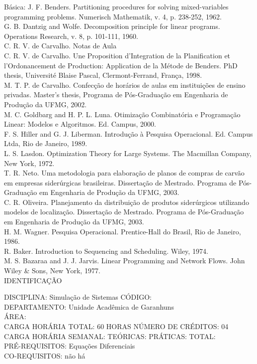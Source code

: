 \documentclass[
	12pt,				%
	openright,			%
  oneside,     %
	a4paper,			%
	english,			%
	french,				%
	spanish,			%
	brazil				%
	]{abntex2}
\begin{document}
\begin{apendicesenv}
Básica:
J. F. Benders. Partitioning procedures for solving mixed-variables
programming problems. Numerisch Mathematik, v. 4, p. 238-252, 1962. \\
G. B. Dantzig and Wolfe. Decomposition principle for linear programs.
Operations Research, v. 8, p. 101-111, 1960. \\
C. R. V. de Carvalho. Notas de Aula\\
C. R. V. de Carvalho. Une Proposition d'Integration de
la Planification et l'Ordonancement de Production:
Application de la Métode de Benders. PhD thesis, Université Blaise
Pascal, Clermont-Ferrand, França, 1998. \\
M. T. P. de Carvalho. Confecção de horários de aulas em instituições de
ensino privadas. Master's thesis, Programa de
Pós-Graduação em Engenharia de Produção da UFMG, 2002. \\
M. C. Goldbarg and H. P. L. Luna. Otimização Combinatória e Programação
Linear: Modelos e Algoritmos. Ed. Campus, 2000. \\
F. S. Hiller and G. J. Liberman. Introdução à Pesquisa Operacional. Ed.
Campus Ltda, Rio de Janeiro, 1989. \\
L. S. Lasdon. Optimization Theory for Large Systems. The Macmillan
Company, New York, 1972. \\
T. R. Neto. Uma metodologia para elaboração de planos de compras de
carvão em empresas siderúrgicas brasileiras. Dissertação de Mestrado.
Programa de Pós-Graduação em Engenharia de Produção da UFMG, 2003. \\
C. R. Oliveira. Planejamento da distribuição de produtos siderúrgicos
utilizando modelos de localização. Dissertação de Mestrado. Programa de
Pós-Graduação em Engenharia de Produção da UFMG, 2003. \\
H. M. Wagner. Pesquisa Operacional. Prentice-Hall do Brasil, Rio de
Janeiro, 1986.\\
R. Baker. Introduction to Sequencing and Scheduling. Wiley, 1974.\\
M. S. Bazaraa and J. J. Jarvis. Linear Programming and Network Flows.
John Wiley \& Sons, New York, 1977. \\

\newpage IDENTIFICAÇÃO

DISCIPLINA: Simulação de Sistemas CÓDIGO:\\ 
DEPARTAMENTO: Unidade Acadêmica de Garanhuns\\ ÁREA: \\
CARGA HORÁRIA TOTAL: 60 HORAS NÚMERO DE CRÉDITOS: 04\\
CARGA HORÁRIA SEMANAL: TEÓRICAS: PRÁTICAS: TOTAL: \\
PRÉ-REQUISITOS: Equações Diferenciais\\
CO-REQUISITOS: não há


\end{apendicesenv}
\end{document}
